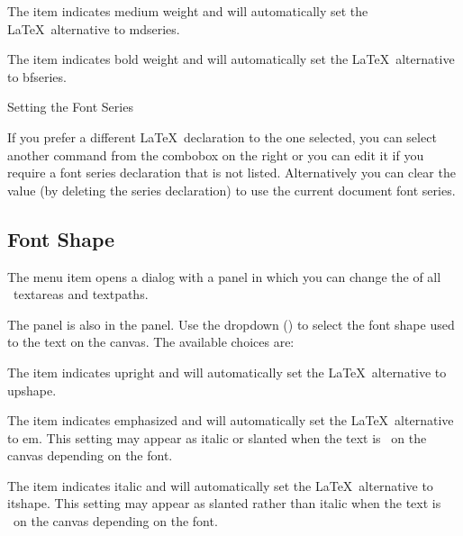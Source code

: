 
The  item indicates medium weight and
will automatically set the \LaTeX\ alternative to \gls{mdseries}.


The  item indicates bold weight and
will automatically set the \LaTeX\ alternative to \gls{bfseries}.

{}
{Setting the Font Series}

If you prefer a different \LaTeX\ declaration to the one selected,
you can select another command from the \gls{combobox} on the right
or you can edit it if you require a font series declaration that is
not listed.  Alternatively you can clear the value (by deleting the
series declaration) to use the current document font series.

\subsection{Font Shape}\label{sec:fontshape}


The  menu item opens a dialog with a 
 panel in which you can change the
of all \selected\ \glspl{textarea} and \glspl{textpath}.


The  panel is also in the 
panel. Use the \gls{dropdown} () to
select the font shape used to  the
text on the \gls{canvas}.
The available choices are:


The  item indicates upright and
will automatically set the \LaTeX\ alternative to \gls{upshape}.


The  item indicates emphasized and
will automatically set the \LaTeX\ alternative to \gls{em}.
This setting may appear as italic or slanted when the text is
\rendered\ on the \gls{canvas} depending on the
font.


The  item indicates italic and
will automatically set the \LaTeX\ alternative to \gls{itshape}.
This setting may appear as slanted rather than italic when the text is
\rendered\ on the \gls{canvas} depending on the
font.

